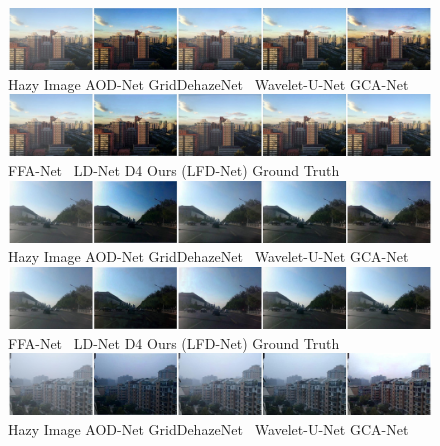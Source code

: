 \documentclass[lettersize,journal]{IEEEtran}
\begin{document}
\begin{figure}[ph!t]
    \centering
    \includegraphics[width=16.5cm]{0_1.jpg} \\
    Hazy Image\qquad\quad\;\; AOD-Net\cite{li2017aod} \qquad GridDehazeNet\cite{liu2019griddehazenet} \;\, Wavelet-U-Net\cite{yang2019wavelet} \qquad GCA-Net\cite{chen2019gated}\\
    
    \includegraphics[width=16.5cm]{0_2.jpg} \\ 
    FFA-Net\cite{qin2020ffa} \qquad\quad\, LD-Net\cite{ullah2021light} \qquad\qquad\;\; D4\cite{yang2022d4} \qquad\qquad\; Ours (LFD-Net) \qquad\quad Ground Truth \\
    
    \includegraphics[width=16.5cm]{1_1.jpg} \\ 
    Hazy Image\qquad\quad\;\; AOD-Net\cite{li2017aod} \qquad GridDehazeNet\cite{liu2019griddehazenet} \;\, Wavelet-U-Net\cite{yang2019wavelet} \qquad GCA-Net\cite{chen2019gated}\\
    
    \includegraphics[width=16.5cm]{1_2.jpg} \\ 
    FFA-Net\cite{qin2020ffa} \qquad\quad\, LD-Net\cite{ullah2021light} \qquad\qquad\;\; D4\cite{yang2022d4} \qquad\qquad\; Ours (LFD-Net) \qquad\quad Ground Truth \\
    
    \includegraphics[width=16.5cm]{2_1.jpg} \\
    Hazy Image\qquad\quad\;\; AOD-Net\cite{li2017aod} \qquad GridDehazeNet\cite{liu2019griddehazenet} \;\, Wavelet-U-Net\cite{yang2019wavelet} \qquad GCA-Net\cite{chen2019gated}\\
    

\end{figure}
\end{document}
